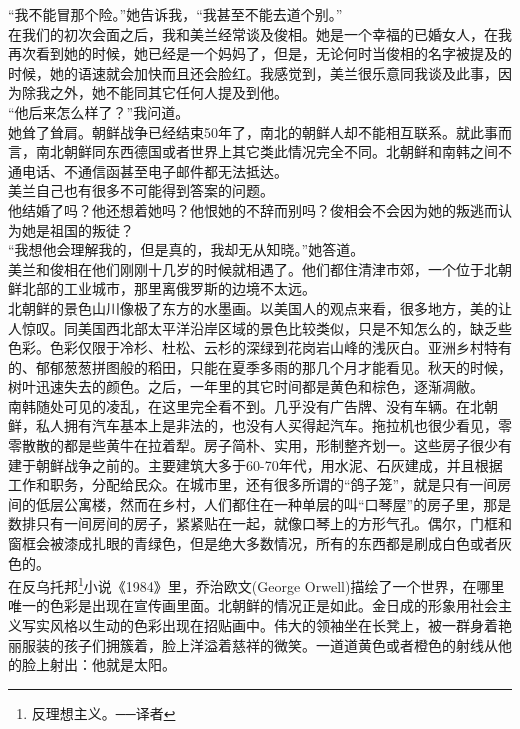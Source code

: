 “我不能冒那个险。”她告诉我，“我甚至不能去道个别。”\\

在我们的初次会面之后，我和美兰经常谈及俊相。她是一个幸福的已婚女人，在我再次看到她的时候，她已经是一个妈妈了，但是，无论何时当俊相的名字被提及的时候，她的语速就会加快而且还会脸红。我感觉到，美兰很乐意同我谈及此事，因为除我之外，她不能同其它任何人提及到他。\\

“他后来怎么样了？”我问道。\\

她耸了耸肩。朝鲜战争已经结束50年了，南北的朝鲜人却不能相互联系。就此事而言，南北朝鲜同东西德国或者世界上其它类此情况完全不同。北朝鲜和南韩之间不通电话、不通信函甚至电子邮件都无法抵达。\\

美兰自己也有很多不可能得到答案的问题。\\

他结婚了吗？他还想着她吗？他恨她的不辞而别吗？俊相会不会因为她的叛逃而认为她是祖国的叛徒？\\

“我想他会理解我的，但是真的，我却无从知晓。”她答道。\\

美兰和俊相在他们刚刚十几岁的时候就相遇了。他们都住清津市郊，一个位于北朝鲜北部的工业城市，那里离俄罗斯的边境不太远。\\

北朝鲜的景色山川像极了东方的水墨画。以美国人的观点来看，很多地方，美的让人惊叹。同美国西北部太平洋沿岸区域的景色比较类似，只是不知怎么的，缺乏些色彩。色彩仅限于冷杉、杜松、云杉的深绿到花岗岩山峰的浅灰白。亚洲乡村特有的、郁郁葱葱拼图般的稻田，只能在夏季多雨的那几个月才能看见。秋天的时候，树叶迅速失去的颜色。之后，一年里的其它时间都是黄色和棕色，逐渐凋敝。\\

南韩随处可见的凌乱，在这里完全看不到。几乎没有广告牌、没有车辆。在北朝鲜，私人拥有汽车基本上是非法的，也没有人买得起汽车。拖拉机也很少看见，零零散散的都是些黄牛在拉着犁。房子简朴、实用，形制整齐划一。这些房子很少有建于朝鲜战争之前的。主要建筑大多于60-70年代，用水泥、石灰建成，并且根据工作和职务，分配给民众。在城市里，还有很多所谓的“鸽子笼”，就是只有一间房间的低层公寓楼，然而在乡村，人们都住在一种单层的叫“口琴屋”的房子里，那是数排只有一间房间的房子，紧紧贴在一起，就像口琴上的方形气孔。偶尔，门框和窗框会被漆成扎眼的青绿色，但是绝大多数情况，所有的东西都是刷成白色或者灰色的。\\

在反乌托邦\footnote{反理想主义。──译者}小说《1984》里，乔治欧文(George Orwell)描绘了一个世界，在哪里唯一的色彩是出现在宣传画里面。北朝鲜的情况正是如此。金日成的形象用社会主义写实风格以生动的色彩出现在招贴画中。伟大的领袖坐在长凳上，被一群身着艳丽服装的孩子们拥簇着，脸上洋溢着慈祥的微笑。一道道黄色或者橙色的射线从他的脸上射出：他就是太阳。\\

